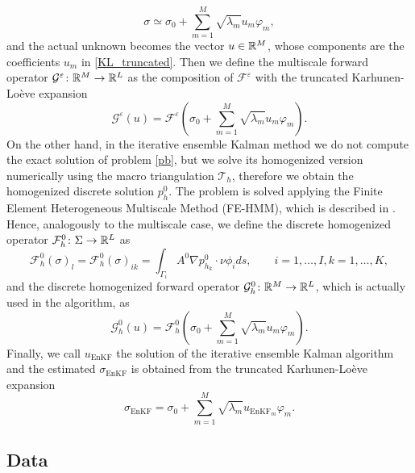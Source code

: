 \begin{equation}
\label{KL_truncated}
\sigma \simeq \sigma_0 + \sum_{m=1}^{M} \sqrt{\lambda_m} u_m \varphi_m,
\end{equation}
and the actual unknown becomes the vector $u \in \mathbb{R}^M$, whose components are the coefficients $u_m$ in \eqref{KL_truncated}. Then we define the multiscale forward operator $\mathcal{G}^{\varepsilon} \colon \mathbb{R}^M \to \mathbb{R}^L$ as the composition of $\mathcal{F}^{\varepsilon}$ with the truncated Karhunen-Lo\`eve expansion
\[ \mathcal{G}^{\varepsilon}(u) = \mathcal{F}^{\varepsilon} \left ( \sigma_0 + \sum_{m=1}^{M} \sqrt{\lambda_m} u_m \varphi_m \right ). \]
On the other hand, in the iterative ensemble Kalman method we do not compute the exact solution of problem \eqref{pb}, but we solve its homogenized version numerically using the macro triangulation $\mathcal{T}_h$, therefore we obtain the homogenized discrete solution $p^0_h$. The problem is solved applying the Finite Element Heterogeneous Multiscale Method (FE-HMM), which is described in \cite{AEE12}. Hence, analogously to the multiscale case, we define the discrete homogenized operator $\mathcal{F}_h^0 \colon \Sigma \to \mathbb{R}^L$ as
\begin{equation}
\label{boundary_integral_0}
\mathcal{F}_h^{0}(\sigma)_{l} = \mathcal{F}_h^{0}(\sigma)_{ik} = \int_{\Gamma_i} A^{0} \nabla p_{h_k}^{0} \cdot \nu \phi_i ds, \qquad i = 1, \dots, I, k = 1, \dots, K,
\end{equation}
and the discrete homogenized forward operator $\mathcal{G}^0_h \colon \mathbb{R}^M \to \mathbb{R}^L$, which is actually used in the algorithm, as
\[ \mathcal{G}_h^{0}(u) = \mathcal{F}_h^{0} \left ( \sigma_0 + \sum_{m=1}^{M} \sqrt{\lambda_m} u_m \varphi_m \right ). \]
Finally, we call $u_{\mathrm{EnKF}}$ the solution of the iterative ensemble Kalman algorithm and the estimated $\sigma_{\mathrm{EnKF}}$ is obtained from the truncated Karhunen-Lo\`eve expansion
\[ \sigma_{\mathrm{EnKF}} = \sigma_0 + \sum_{m=1}^M \sqrt{\lambda_m} u_{\mathrm{EnKF}_m} \varphi_m. \]

\subsection{Data}


